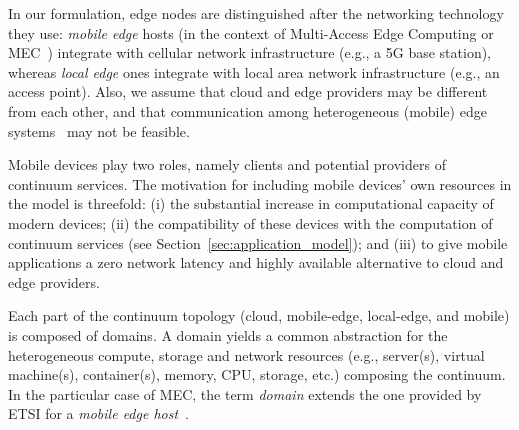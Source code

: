 %
%

In our formulation, edge nodes are distinguished after the networking technology they use: \textit{mobile edge} hosts (in the context of Multi-Access Edge Computing or MEC~\cite{etsimec16,ahmed2016isco}) integrate with cellular network infrastructure (e.g., a 5G base station), whereas \textit{local edge} ones integrate with local area network infrastructure (e.g., an access point). Also, we assume that cloud and edge providers may be different from each other, and that communication among heterogeneous (mobile) edge systems~\cite{etsimec16} may not be feasible.%


Mobile devices play two roles, namely clients and potential providers of continuum services. The motivation for including mobile devices' own  resources in the model is threefold: (i) the substantial increase in computational capacity of modern devices; (ii) the compatibility of these devices with the computation of continuum services (see Section~\ref{sec:application_model}); and (iii) to give mobile applications a zero network latency and highly available alternative to cloud and edge providers. 

Each part of the continuum topology (cloud, mobile-edge, local-edge, and mobile) is composed of domains.
A domain yields a common  abstraction for the heterogeneous compute, storage and network resources (e.g., server(s), virtual machine(s), container(s), memory, CPU, storage, etc.) composing the continuum. In the particular case of MEC, the term \textit{domain} extends the one provided by ETSI for a \textit{mobile edge host}~\cite{etsimec16}.




